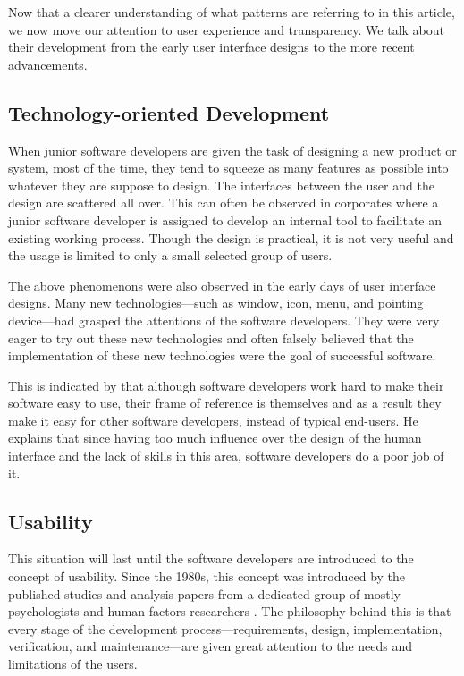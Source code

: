 \documentclass[a4paper,titlepage]{article}
\begin{document}
Now that a clearer understanding of what patterns are referring to in
this article, we now move our attention to user experience and
transparency. We talk about their development from the early user
interface designs to the more recent advancements.

\subsection{Technology-oriented Development}
When junior software developers are given the task of designing a new
product or system, most of the time, they tend to squeeze as many
features as possible into whatever they are suppose to design. The
interfaces between the user and the design are scattered all
over. This can often be observed in corporates where a junior software
developer is assigned to develop an internal tool to facilitate an
existing working process. Though the design is practical, it is not
very useful and the usage is limited to only a small selected group of
users.

The above phenomenons were also observed in the early days of user
interface designs. Many new technologies---such as window, icon, menu,
and pointing device---had grasped the attentions of the software
developers. They were very eager to try out these new technologies and
often falsely believed that the implementation of these new
technologies were the goal of successful software.

This is indicated by \citet{inmates:cooper} that although software
developers work hard to make their software easy to use, their frame
of reference is themselves and as a result they make it easy for other
software developers, instead of typical end-users. He explains that
since having too much influence over the design of the human interface
and the lack of skills in this area, software developers do a poor job
of it.

\subsection{Usability}
This situation will last until the software developers are introduced
to the concept of usability. Since the 1980s, this concept was
introduced by the published studies and analysis papers from a
dedicated group of mostly psychologists and human factors researchers
\citep{human:rubinstein, friendly:simpson, human:shneiderman,
  human:brown, software:dumas}. The philosophy behind this is that
every stage of the development process---requirements, design,
implementation, verification, and maintenance---are given great
attention to the needs and limitations of the users.
\end{document}
